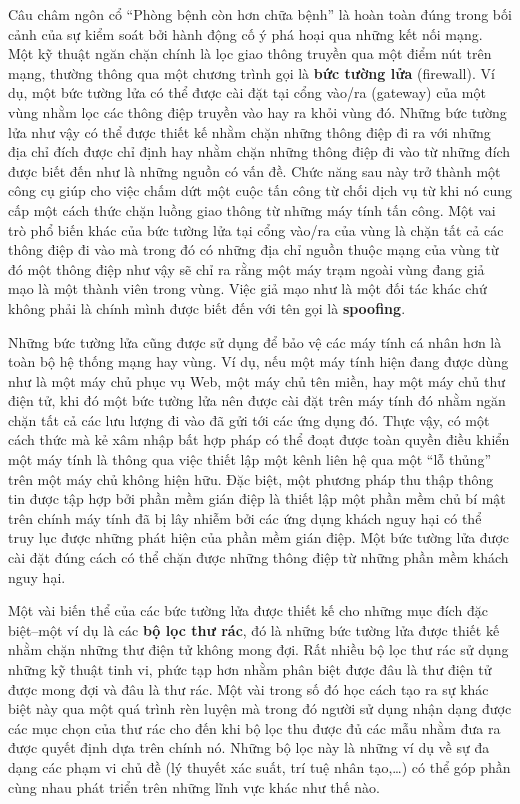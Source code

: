 Câu châm ngôn cổ ``Phòng bệnh còn hơn chữa bệnh'' là hoàn toàn đúng trong bối cảnh của sự
kiểm soát bởi hành động cố ý phá hoại qua những kết nối mạng. Một kỹ thuật ngăn chặn chính
là lọc giao thông truyền qua một điểm nút trên mạng, thường thông qua một chương trình gọi
là \textbf{bức tường lửa} (firewall). Ví dụ, một bức tường lửa có thể được cài đặt tại
cổng vào/ra (gateway) của một vùng nhằm lọc các thông điệp truyền vào hay ra khỏi vùng
đó. Những bức tường lửa như vậy có thể được thiết kế nhằm chặn những thông điệp đi ra với
những địa chỉ đích được chỉ định hay nhằm chặn những thông điệp đi vào từ những đích được
biết đến như là những nguồn có vấn đề. Chức năng sau này trở thành một công cụ giúp cho
việc chấm dứt một cuộc tấn công từ chối dịch vụ từ khi nó cung cấp một cách thức chặn
luồng giao thông từ những máy tính tấn công. Một vai trò phổ biến khác của bức tường lửa
tại cổng vào/ra của vùng là chặn tất cả các thông điệp đi vào mà trong đó có những địa chỉ
nguồn thuộc mạng của vùng từ đó một thông điệp như vậy sẽ chỉ ra rằng một máy trạm ngoài
vùng đang giả mạo là một thành viên trong vùng. Việc giả mạo như là một đối tác khác chứ
không phải là chính mình được biết đến với tên gọi là \textbf{spoofing}.


Những bức tường lửa cũng được sử dụng để bảo vệ các máy tính cá nhân hơn là toàn bộ hệ
thống mạng hay vùng. Ví dụ, nếu một máy tính hiện đang được dùng như là một máy chủ phục
vụ Web, một máy chủ tên miền, hay một máy chủ thư điện tử, khi đó một bức tường lửa nên
được cài đặt trên máy tính đó nhằm ngăn chặn tất cả các lưu lượng đi vào đã gửi tới các
ứng dụng đó. Thực vậy, có một cách thức mà kẻ xâm nhập bất hợp pháp có thể đoạt được toàn
quyền điều khiển một máy tính là thông qua việc thiết lập một kênh liên hệ qua một “lỗ
thủng” trên một máy chủ không hiện hữu. Đặc biệt, một phương pháp thu thập thông tin được tập
hợp bởi phần mềm gián điệp là thiết lập một phần mềm chủ bí mật trên chính máy tính đã bị
lây nhiễm bởi các ứng dụng khách nguy hại có thể truy lục được những phát hiện của phần
mềm gián điệp. Một bức tường lửa được cài đặt đúng cách có thể chặn được những thông điệp
từ những phần mềm khách nguy hại.

Một vài biến thể của các bức tường lửa được thiết kế cho những mục đích đặc biệt--một ví
dụ là các \textbf{bộ lọc thư rác}, đó là những bức tường lửa được thiết kế nhằm chặn những
thư điện tử không mong đợi. Rất nhiều bộ lọc thư rác sử dụng những kỹ thuật tinh vi, phức
tạp hơn nhằm phân biệt được đâu là thư điện tử được mong đợi và đâu là thư rác. Một vài
trong số đó học cách tạo ra sự khác biệt này qua một quá trình rèn luyện mà trong đó người
sử dụng nhận dạng được các mục chọn của thư rác cho đến khi bộ lọc thu được đủ các mẫu
nhằm đưa ra được quyết định dựa trên chính nó. Những bộ lọc này là những ví dụ về sự đa
dạng các phạm vi chủ đề (lý thuyết xác suất, trí tuệ nhân tạo,…) có thể góp phần cùng nhau
phát triển trên những lĩnh vực khác như thế nào.

